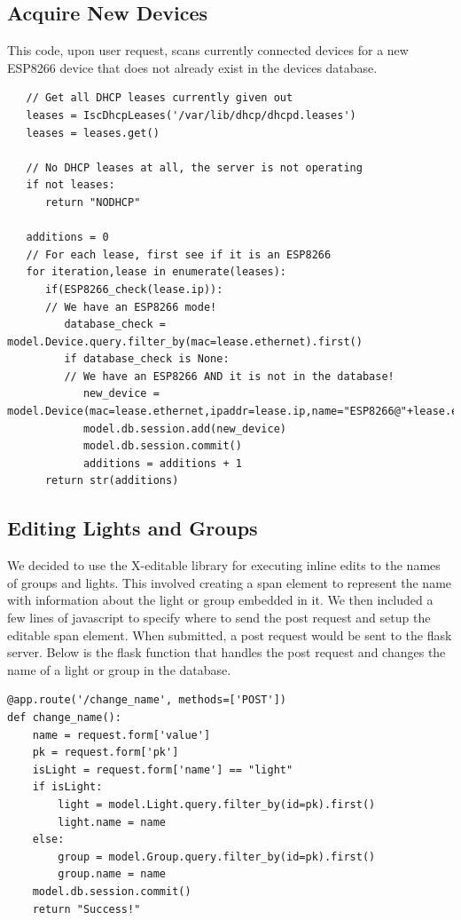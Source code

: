 \documentclass[oneside,openright]{book}
\begin{document}
\subsection{Acquire New Devices}

This code, upon user request, scans currently connected devices for a new
ESP8266 device that does not already exist in the devices database.

\begin{lstlisting}
   // Get all DHCP leases currently given out
   leases = IscDhcpLeases('/var/lib/dhcp/dhcpd.leases')
   leases = leases.get()

   // No DHCP leases at all, the server is not operating
   if not leases:
      return "NODHCP"

   additions = 0
   // For each lease, first see if it is an ESP8266
   for iteration,lease in enumerate(leases):
      if(ESP8266_check(lease.ip)):
      // We have an ESP8266 mode!
         database_check = model.Device.query.filter_by(mac=lease.ethernet).first()
         if database_check is None:
         // We have an ESP8266 AND it is not in the database!
            new_device = model.Device(mac=lease.ethernet,ipaddr=lease.ip,name="ESP8266@"+lease.ethernet)
            model.db.session.add(new_device)
            model.db.session.commit()
            additions = additions + 1
      return str(additions)
   \end{lstlisting}

\subsection{Editing Lights and Groups}

We decided to use the X-editable library for executing inline edits to the
names of groups and lights. This involved creating a span element to represent
the name with information about the light or group embedded in it. We then
included a few lines of javascript to specify where to send the post request
and setup the editable span element. When submitted, a post request would be
sent to the flask server. Below is the flask function that handles the post
request and changes the name of a light or group in the database.

\begin{lstlisting}
@app.route('/change_name', methods=['POST'])
def change_name():
    name = request.form['value']
    pk = request.form['pk']
    isLight = request.form['name'] == "light"
    if isLight:
        light = model.Light.query.filter_by(id=pk).first()
        light.name = name
    else:
        group = model.Group.query.filter_by(id=pk).first()
        group.name = name
    model.db.session.commit()
    return "Success!"
\end{lstlisting}
\end{document}
